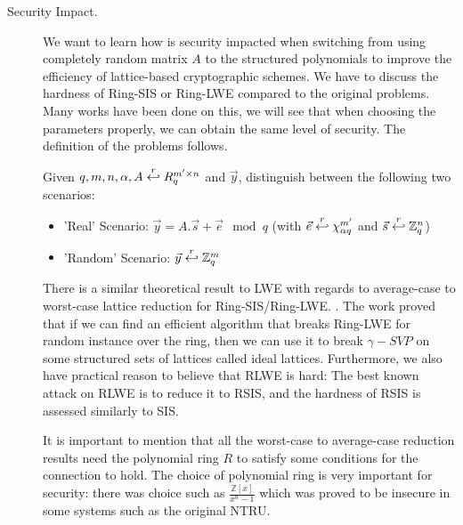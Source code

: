 \begin{description}
\begin{description}
        \item [Security Impact.] We want to learn how is security impacted when
            switching from using completely random matrix $A$ to the structured
            polynomials to improve the efficiency of lattice-based cryptographic
            schemes. We have to discuss
            the hardness of Ring-SIS or Ring-LWE compared to the
            original problems. Many works have been done on this, we will see
            that when
            choosing the parameters properly, we can obtain the same level of
            security. The definition of the problems follows.
            \begin{definition}
                 Given
                    $q, m, n, \alpha, A \stackrel{r}{\hookleftarrow} {R}_q^{m' \times
                    n}$ and $\vec{y}$, distinguish between the following two
                    scenarios:
                    \begin{itemize}
                        \item 'Real' Scenario: $\vec{y} = A.\vec{s} +
                            \vec{e} \mod q$ (with $\vec{e} \stackrel{r}{\hookleftarrow}
                                \chi_{\alpha q}^{m'}$ and $\vec{s} \stackrel{r}{\hookleftarrow}
                            \mathbb{Z}_q^n$)
                        \item 'Random' Scenario: $\vec{y} \stackrel{r}{\hookleftarrow}
                            \mathbb{Z}_q^m$
                    \end{itemize}
            \end{definition}
            There is a similar theoretical result to LWE with regards to
            average-case to worst-case lattice reduction for Ring-SIS/Ring-LWE.
            \cite{lyubashevsky2010ideal}. The work proved that if we can find an efficient
            algorithm that breaks Ring-LWE for random instance over the ring,
            then we can use it to break $\gamma-SVP$ on some structured sets of
            lattices called ideal lattices. Furthermore, we also have practical
            reason to believe that RLWE is hard: The best known attack on RLWE is to
            reduce it to RSIS, and the hardness of RSIS is assessed similarly to
            SIS.

            It is important to mention that all the worst-case to average-case
            reduction results need the polynomial ring $R$ to satisfy some
            conditions for the connection to hold. The choice
            of polynomial ring is very important for security: there was choice such
            as $\frac{\mathbb{Z}[x]}{x^n - 1}$ which was proved to be insecure
            in some systems such as the original NTRU.


\end{description}
\end{description}
